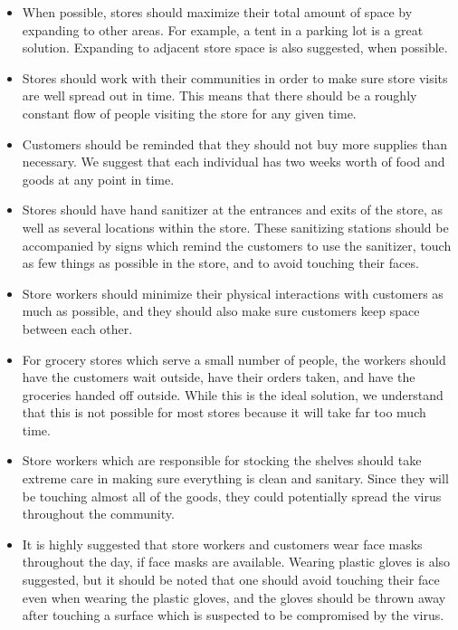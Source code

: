 \documentclass[onecolumn,journal]{IEEEtran}
\begin{document}
\begin{multicols}{2}
\begin{itemize}
    \item When possible, stores should maximize their total amount of space by expanding to other areas. For example, a tent in a parking lot is a great solution. Expanding to adjacent store space is also suggested, when possible.
    
    \item Stores should work with their communities in order to make sure store visits are well spread out in time. This means that there should be a roughly constant flow of people visiting the store for any given time.
    
    \item Customers should be reminded that they should not buy more supplies than necessary. We suggest that each individual has two weeks worth of food and goods at any point in time.
    
    \item Stores should have hand sanitizer at the entrances and exits of the store, as well as several locations within the store. These sanitizing stations should be accompanied by signs which remind the customers to use the sanitizer, touch as few things as possible in the store, and to avoid touching their faces.
    
    \item Store workers should minimize their physical interactions with customers as much as possible, and they should also make sure customers keep space between each other.
    
    \item For grocery stores which serve a small number of people, the workers should have the customers wait outside, have their orders taken, and have the groceries handed off outside. While this is the ideal solution, we understand that this is not possible for most stores because it will take far too much time.
    
    \item Store workers which are responsible for stocking the shelves should take extreme care in making sure everything is clean and sanitary. Since they will be touching almost all of the goods, they could potentially spread the virus throughout the community.
    
    \item It is highly suggested that store workers and customers wear face masks throughout the day, if face masks are available. Wearing plastic gloves is also suggested, but it should be noted that one should avoid touching their face even when wearing the plastic gloves, and the gloves should be thrown away after touching a surface which is suspected to be compromised by the virus.
    

\end{itemize}
\end{multicols}
\end{document}
